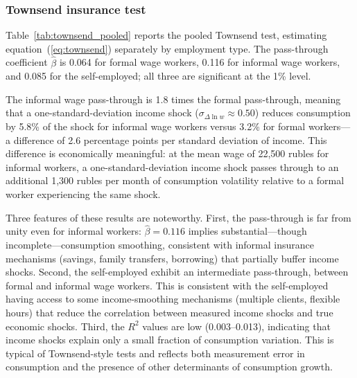 \documentclass[12pt]{article}
\begin{document}
\subsubsection{Townsend insurance test}

Table~\ref{tab:townsend_pooled} reports the pooled Townsend test, estimating equation~(\ref{eq:townsend}) separately by employment type. The pass-through coefficient $\hat{\beta}$ is 0.064 for formal wage workers, 0.116 for informal wage workers, and 0.085 for the self-employed; all three are significant at the 1\% level.

The informal wage pass-through is 1.8 times the formal pass-through, meaning that a one-standard-deviation income shock ($\sigma_{\Delta \ln w} \approx 0.50$) reduces consumption by 5.8\% of the shock for informal wage workers versus 3.2\% for formal workers---a difference of 2.6 percentage points per standard deviation of income. This difference is economically meaningful: at the mean wage of 22,500 rubles for informal workers, a one-standard-deviation income shock passes through to an additional 1,300 rubles per month of consumption volatility relative to a formal worker experiencing the same shock.

Three features of these results are noteworthy. First, the pass-through is far from unity even for informal workers: $\hat{\beta} = 0.116$ implies substantial---though incomplete---consumption smoothing, consistent with informal insurance mechanisms (savings, family transfers, borrowing) that partially buffer income shocks. Second, the self-employed exhibit an intermediate pass-through, between formal and informal wage workers. This is consistent with the self-employed having access to some income-smoothing mechanisms (multiple clients, flexible hours) that reduce the correlation between measured income shocks and true economic shocks. Third, the $R^2$ values are low (0.003--0.013), indicating that income shocks explain only a small fraction of consumption variation. This is typical of Townsend-style tests \citep{Townsend1994} and reflects both measurement error in consumption and the presence of other determinants of consumption growth.
\end{document}
